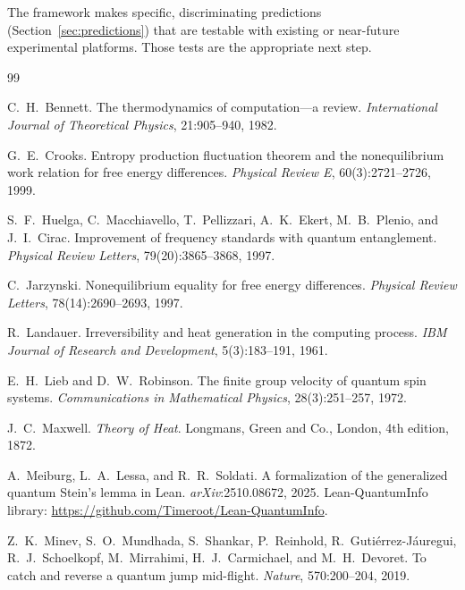 \documentclass[11pt,a4paper]{article}
\theoremstyle{plain}
\theoremstyle{definition}
\theoremstyle{remark}
\begin{document}
The framework makes specific, discriminating predictions (Section~\ref{sec:predictions})
that are testable with existing or near-future experimental platforms. Those tests
are the appropriate next step.

\begin{thebibliography}{99}

C.~H.~Bennett.
\newblock The thermodynamics of computation---a review.
\newblock \textit{International Journal of Theoretical Physics}, 21:905--940,
  1982.

G.~E.~Crooks.
\newblock Entropy production fluctuation theorem and the nonequilibrium work
  relation for free energy differences.
\newblock \textit{Physical Review E}, 60(3):2721--2726, 1999.


S.~F.~Huelga, C.~Macchiavello, T.~Pellizzari, A.~K.~Ekert, M.~B.~Plenio, and
  J.~I.~Cirac.
\newblock Improvement of frequency standards with quantum entanglement.
\newblock \textit{Physical Review Letters}, 79(20):3865--3868, 1997.

C.~Jarzynski.
\newblock Nonequilibrium equality for free energy differences.
\newblock \textit{Physical Review Letters}, 78(14):2690--2693, 1997.

R.~Landauer.
\newblock Irreversibility and heat generation in the computing process.
\newblock \textit{IBM Journal of Research and Development}, 5(3):183--191, 1961.

E.~H.~Lieb and D.~W.~Robinson.
\newblock The finite group velocity of quantum spin systems.
\newblock \textit{Communications in Mathematical Physics}, 28(3):251--257, 1972.

J.~C.~Maxwell.
\newblock \textit{Theory of Heat}.
\newblock Longmans, Green and Co., London, 4th edition, 1872.

A.~Meiburg, L.~A.~Lessa, and R.~R.~Soldati.
\newblock A formalization of the generalized quantum {Stein's} lemma in {Lean}.
\newblock \textit{arXiv}:2510.08672, 2025.
\newblock Lean-QuantumInfo library:
  \url{https://github.com/Timeroot/Lean-QuantumInfo}.

Z.~K.~Minev, S.~O.~Mundhada, S.~Shankar, P.~Reinhold, R.~Guti\'{e}rrez-J\'{a}uregui,
  R.~J.~Schoelkopf, M.~Mirrahimi, H.~J.~Carmichael, and M.~H.~Devoret.
\newblock To catch and reverse a quantum jump mid-flight.
\newblock \textit{Nature}, 570:200--204, 2019.


\end{thebibliography}
\end{document}
